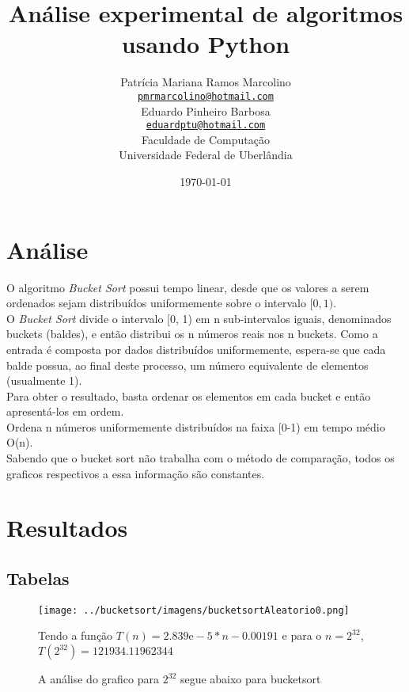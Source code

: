 \documentclass[12pt,a4paper,twoside]{report}
\title{Análise experimental de algoritmos usando Python}
\author{Patrícia Mariana Ramos Marcolino \\
\texttt{\small \url{pmrmarcolino@hotmail.com}}
\vspace{1cm} \\
Eduardo Pinheiro Barbosa\\
\texttt{\small \url{eduardptu@hotmail.com}}
\vspace{1cm} \\
Faculdade de Computação \\
Universidade Federal de Uberlândia
}
\date{\today}
\begin{document}
\maketitle
\listoffigures
\listoftables
\lstlistoflistings

\tableofcontents
\fancyhead[RE,LO]{\thesection}

\setlength{\parskip}{0.15in} %

\chapter{Análise}

O algoritmo {\it Bucket Sort} possui tempo linear, desde que
os valores a serem ordenados sejam distribuídos
uniformemente sobre o intervalo $[0, 1)$.\\
O {\it Bucket Sort} divide o intervalo
[0, 1) em n sub-intervalos iguais, denominados buckets
(baldes), e então distribui os n números reais nos n
buckets. Como a entrada é composta por dados
distribuídos uniformemente, espera-se que cada balde
possua, ao final deste processo, um número equivalente
de elementos (usualmente 1).\\
Para obter o resultado, basta ordenar os elementos em
cada bucket e então apresentá-los em ordem.\\
Ordena n números uniformemente
distribuídos na faixa [0-1) em tempo médio O(n).
\\Sabendo que o bucket sort não trabalha com o método de comparação, todos os graficos respectivos a essa informação são constantes.
\chapter{Resultados}
\section{Tabelas}



\begin{figure}[ht]
\centering \texttt{[image: ../bucketsort/imagens/bucketsortAleatorio0.png]}
\caption{A análise do grafico para $2^{32}$ segue abaixo para bucketsort}

Tendo a função $T(n) = 2.839\mathrm{e}-5*n-0.00191$ e para o $n =2^{32}$, $T(2^{32}) = 121934.11962344$ 
\label{fig:bucketsortAleatorio0}
\end{figure}
\end{document}
